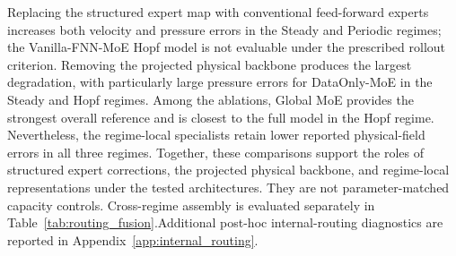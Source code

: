Replacing the structured expert map with conventional feed-forward experts increases both velocity and pressure errors in the Steady and Periodic regimes; the Vanilla-FNN-MoE Hopf model is not evaluable under the prescribed rollout criterion. Removing the projected physical backbone produces the largest degradation, with particularly large pressure errors for DataOnly-MoE in the Steady and Hopf regimes. Among the ablations, Global MoE provides the strongest overall reference and is closest to the full model in the Hopf regime. Nevertheless, the regime-local specialists retain lower reported physical-field errors in all three regimes. Together, these comparisons support the roles of structured expert corrections, the projected physical backbone, and regime-local representations under the tested architectures. They are not parameter-matched capacity controls. Cross-regime assembly is evaluated separately in Table~\ref{tab:routing_fusion}.Additional post-hoc internal-routing diagnostics are reported in
Appendix~\ref{app:internal_routing}.








